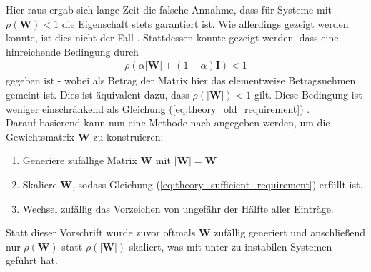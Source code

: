Hier raus ergab sich lange Zeit die falsche Annahme, dass für Systeme mit $\rho(\mathbf{W}) < 1$ die Eigenschaft stets garantiert ist. Wie allerdings gezeigt werden konnte, ist dies nicht der Fall \citep{yildiz}. Stattdessen konnte gezeigt werden, dass eine hinreichende Bedingung durch
\begin{align}
\label{eq:theory_sufficient_requirement}
\rho(\alpha |\mathbf{W}|+(1-\alpha) \mathbf{I}) < 1
\end{align}
gegeben ist - wobei als Betrag der Matrix hier das elementweise Betragsnehmen gemeint ist. Dies ist äquivalent dazu, dass $\rho(|\mathbf{W}|) < 1$ gilt. Diese Bedingung ist weniger einschränkend als Gleichung (\ref{eq:theory_old_requirement}) \cite{yildiz}.\\

Darauf basierend kann nun eine Methode nach \cite{yildiz} angegeben werden, um die Gewichtsmatrix $\mathbf{W}$ zu konstruieren:

\singlespacing
\begin{enumerate}
	\item Generiere zufällige Matrix $\mathbf{W}$ mit $\mathbf{|W|} = \mathbf{W}$
	\item Skaliere $\mathbf{W}$, sodass Gleichung (\ref{eq:theory_sufficient_requirement}) erfüllt ist.
	\item Wechsel zufällig das Vorzeichen von ungefähr der Hälfte aller Einträge.
\end{enumerate}
\onehalfspacing

Statt dieser Vorschrift wurde zuvor oftmals $\mathbf{W}$ zufällig generiert und anschließend nur $\rho(\mathbf{W})$ statt $\rho(|\mathbf{W}|)$ skaliert, was mit unter zu instabilen Systemen geführt hat.